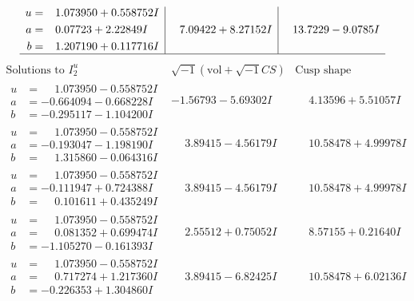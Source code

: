 \documentclass[1p]{elsarticle_modified}
\theoremstyle{definition}
\newcommand{\I}{\sqrt{-1}}
\begin{document}
$$\begin{array}{c|c|c}
\begin{aligned}
u &= \phantom{-}1.073950 + 0.558752 I \\
a &= \phantom{-}0.07723 + 2.22849 I \\
b &= \phantom{-}1.207190 + 0.117716 I\end{aligned}
 & \phantom{-}7.09422 + 8.27152 I & \phantom{-}13.7229 - 9.0785 I\\
 \hline 
 \end{array}$$\newpage$$\begin{array}{c|c|c}  
\text{Solutions to }I^u_{2}& \I (\text{vol} + \sqrt{-1}CS) & \text{Cusp shape}\\
 \hline 
\begin{aligned}
u &= \phantom{-}1.073950 - 0.558752 I \\
a &= -0.664094 - 0.668228 I \\
b &= -0.295117 - 1.104200 I\end{aligned}
 & -1.56793 - 5.69302 I & \phantom{-}4.13596 + 5.51057 I \\ \hline\begin{aligned}
u &= \phantom{-}1.073950 - 0.558752 I \\
a &= -0.193047 - 1.198190 I \\
b &= \phantom{-}1.315860 - 0.064316 I\end{aligned}
 & \phantom{-}3.89415 - 4.56179 I & \phantom{-}10.58478 + 4.99978 I \\ \hline\begin{aligned}
u &= \phantom{-}1.073950 - 0.558752 I \\
a &= -0.111947 + 0.724388 I \\
b &= \phantom{-}0.101611 + 0.435249 I\end{aligned}
 & \phantom{-}3.89415 - 4.56179 I & \phantom{-}10.58478 + 4.99978 I \\ \hline\begin{aligned}
u &= \phantom{-}1.073950 - 0.558752 I \\
a &= \phantom{-}0.081352 + 0.699474 I \\
b &= -1.105270 - 0.161393 I\end{aligned}
 & \phantom{-}2.55512 + 0.75052 I & \phantom{-}8.57155 + 0.21640 I \\ \hline\begin{aligned}
u &= \phantom{-}1.073950 - 0.558752 I \\
a &= \phantom{-}0.717274 + 1.217360 I \\
b &= -0.226353 + 1.304860 I\end{aligned}
 & \phantom{-}3.89415 - 6.82425 I & \phantom{-}10.58478 + 6.02136 I \\ \hline\begin{aligned}

\end{aligned}
\end{array}$$
\end{document}
